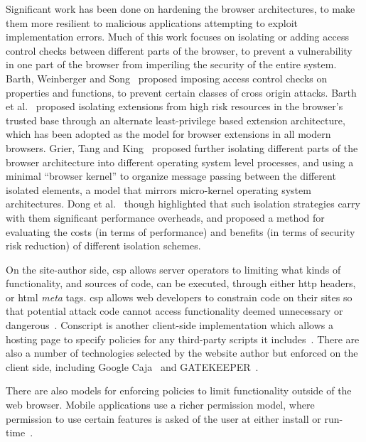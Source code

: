 Significant work has been done on hardening the browser architectures, to make them
more resilient to malicious applications attempting to exploit implementation
errors.  Much of this work focuses on isolating or adding access control checks
between different parts of the browser, to prevent a vulnerability in one part
of the browser from imperiling the security of the entire system.  Barth,
Weinberger and Song~\cite{barth2009cross} proposed imposing access control checks
on \JS properties and functions, to prevent certain classes of cross origin
\JS attacks.  Barth et al.~\cite{barth2010protecting} proposed isolating
extensions from high risk resources in the browser's trusted base through
an alternate least-privilege based extension architecture, which has been
adopted as the model for browser extensions in all modern browsers.  Grier,
Tang and King~\cite{grier2008secure} proposed further isolating different
parts of the browser architecture into different operating system level
processes, and using a minimal ``browser kernel'' to organize message passing
between the different isolated elements, a model that mirrors micro-kernel
operating system architectures.  Dong et al.~\cite{dong2013quantitative}
though highlighted that such isolation strategies carry with them significant
performance overheads, and proposed a method for evaluating the costs (in
terms of performance) and benefits (in terms of security risk reduction)
of different isolation schemes.

On the site-author side, \gls{csp} allows server operators to limiting what
kinds of \JS functionality, and sources of code, can be executed, through
either \gls{http} headers, or \gls{html} \textit{meta} tags.
\gls{csp} allows web developers to constrain code on their
sites so that potential attack code cannot access functionality deemed
unnecessary or dangerous~\cite{stamm2010reining}.  Conscript is another
client-side implementation which allows a hosting page to specify policies for
any third-party scripts it includes~\cite{meyerovich2010conscript}.  There are
also a number of technologies selected by the website author but enforced on
the client side,  including Google Caja~\cite{google13caja} and
GATEKEEPER~\cite{guarnieri09gatekeeper}.

There are also models for enforcing policies to limit functionality outside
of the web browser.  Mobile applications use a richer permission model,
where permission to use certain features is asked of the user at either install
or run-time~\cite{android-permissions,au2011short}.

